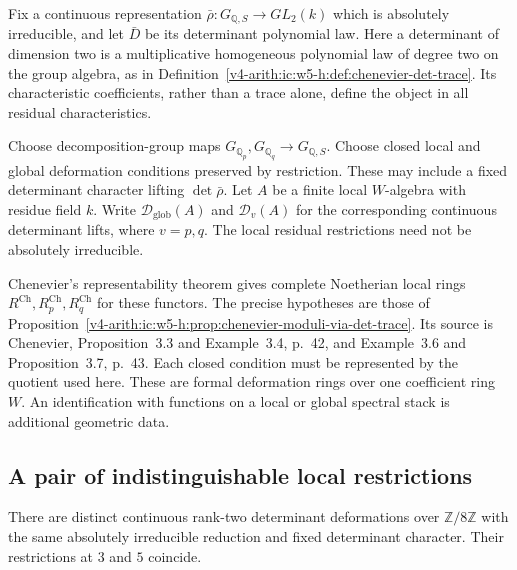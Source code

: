 Fix a continuous representation
$\bar\rho:G_{\mathbb Q,S}\to GL_2(k)$ which is absolutely
irreducible, and let $\bar D$ be its determinant polynomial law.
Here a determinant of dimension two is a multiplicative homogeneous
polynomial law of degree two on the group algebra, as in
Definition~\ref{v4-arith:ic:w5-h:def:chenevier-det-trace}.
Its characteristic coefficients, rather than a trace alone, define
the object in all residual characteristics.

Choose decomposition-group maps
$G_{\mathbb Q_p},G_{\mathbb Q_q}\to G_{\mathbb Q,S}$.
Choose closed local and global deformation conditions preserved by
restriction. These may include a fixed determinant character lifting
$\det\bar\rho$. Let $A$ be a finite local $W$-algebra with residue field $k$.
Write $\mathcal D_{\mathrm{glob}}(A)$ and $\mathcal D_v(A)$
for the corresponding continuous determinant lifts, where $v=p,q$.
The local residual restrictions need not be absolutely irreducible.

Chenevier's representability theorem gives complete Noetherian local
rings $R^{\mathrm{Ch}},R_p^{\mathrm{Ch}},R_q^{\mathrm{Ch}}$ for
these functors. The precise hypotheses are those of
Proposition~\ref{v4-arith:ic:w5-h:prop:chenevier-moduli-via-det-trace}.
Its source is Chenevier, Proposition~3.3 and Example~3.4, p.~42,
and Example~3.6 and Proposition~3.7, p.~43.
Each closed condition must be represented by the quotient used here.
These are formal deformation rings over one coefficient ring $W$.
An identification with functions on a local or global spectral stack
is additional geometric data.

\subsection{A pair of indistinguishable local restrictions}

\begin{proposition}
\label{v4-arith:ic:bcglue-core:prop:two-prime-nonuniqueness}
There are distinct continuous rank-two determinant deformations over
$\mathbb Z/8\mathbb Z$ with the same absolutely irreducible reduction
and fixed determinant character. Their restrictions at $3$ and $5$ coincide.
\end{proposition}

